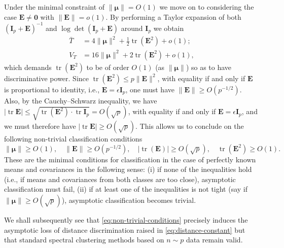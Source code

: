 \documentclass[MAL,biber]{nowfnt} %
\DeclareMathOperator{\tr}{tr}
\newcommand{\E}{{\mathbf{E}}}
\newcommand{\I}{{\mathbf{I}}}
\newcommand{\bmu}{{ \boldsymbol{\mu} }}
\newcommand{\zo}{{\mathbf{0}}}
\begin{document}
Under the minimal constraint of $\| \bmu \| = O(1)$ we move on to considering the case $\E \neq \zo$ with $\| \E \| = o(1)$. By performing a Taylor expansion of both $(\I_p + \E)^{-1}$ and $\log \det(\I_p + \E)$ around $\I_p$ we obtain
\begin{align*}
    \bar T & = 4 \| \bmu \|^2  + \frac12 \tr (\E^2) + o(1); \\
    V_T & = 16 \| \bmu \|^2 + 2 \tr (\E^2) + o(1),
\end{align*}
which demands $\tr(\E^2)$ to be of order $O(1)$ (as $\| \bmu \|$) so as to have discriminative power. Since $\tr (\E^2) \le p \| \E \|^2$, with equality if and only if $\E$ is proportional to identity, i.e., $\E= \epsilon \I_p$, one must have $\| \E \| \ge O(p^{-1/2}) $. Also, by the Cauchy–Schwarz inequality, we have $|\tr \E| \leq \sqrt{\tr (\E^2) \cdot \tr \I_p}=O(\sqrt{p})$, with equality if and only if $\E= \epsilon \I_p$, and we must therefore have $|\tr \E|\geq O(\sqrt{p})$. This allows us to conclude on the following non-trivial classification conditions
\begin{equation}\label{eq:non-trivial-conditions}
    \| \bmu \| \geq O(1), \quad \| \E \| \geq O(p^{-1/2}), \quad |\tr(\E)| \geq O(\sqrt{p}), \quad \tr(\E^2) \geq O(1).
\end{equation}
These are the minimal conditions for classification in the case of perfectly known means and covariances in the following sense: (i) if none of the inequalities hold (i.e., if means and covariances from both classes are too close), asymptotic classification must fail, (ii) if at least one of the inequalities is not tight (say if $\|\bmu\|\geq O(\sqrt p)$), asymptotic classification becomes trivial. 

\medskip

We shall subsequently see that \eqref{eq:non-trivial-conditions} precisely induces the asymptotic loss of distance discrimination raised in \eqref{eq:distance-constant} but that standard spectral clustering methods based on $n\sim p$ data remain valid.
\end{document}
